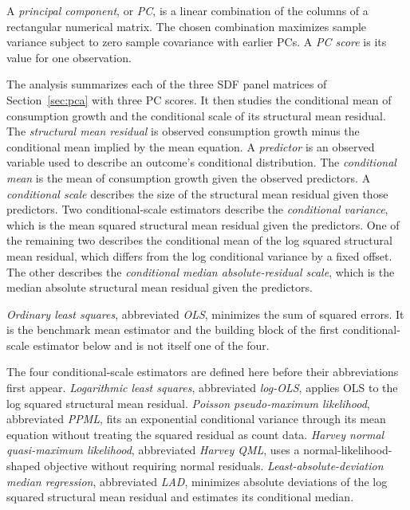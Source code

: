 \documentclass[11pt]{article}
\begin{document}
A \emph{principal component}, or \emph{PC}, is a linear combination of the columns of a
rectangular numerical matrix. The chosen combination maximizes sample variance subject to zero
sample covariance with earlier PCs. A \emph{PC score} is its value for one observation.

The analysis summarizes each of the three SDF panel matrices of Section~\ref{sec:pca} with three PC scores. It then studies the conditional
mean of consumption growth and the conditional scale of its structural mean residual. The
\emph{structural mean residual} is observed
consumption growth minus the conditional mean implied by the mean equation. A
\emph{predictor} is an observed variable used to describe an outcome's conditional distribution.
The \emph{conditional mean} is the mean of consumption growth given the observed predictors. A
\emph{conditional scale} describes the size of the structural mean residual given those predictors.
Two conditional-scale estimators describe the \emph{conditional variance}, which is the mean
squared structural mean residual given the predictors. One of the remaining two describes the
conditional mean of the log squared structural mean residual, which differs from the log conditional
variance by a fixed offset. The other describes the \emph{conditional
median absolute-residual scale}, which is the median absolute structural mean residual given the
predictors.

\emph{Ordinary least squares}, abbreviated \emph{OLS}, minimizes the sum of squared errors. It is the
benchmark mean estimator and the building block of the first conditional-scale estimator below and
is not itself one of the four.

The four conditional-scale estimators are defined here before their
abbreviations first appear.
\emph{Logarithmic least squares}, abbreviated \emph{log-OLS}, applies OLS to the log squared
structural mean residual. \emph{Poisson pseudo-maximum likelihood}, abbreviated
\emph{PPML}, fits an exponential conditional variance through its mean equation without treating
the squared residual as count data. \emph{Harvey normal quasi-maximum likelihood}, abbreviated
\emph{Harvey QML}, uses a normal-likelihood-shaped objective without requiring normal residuals.
\emph{Least-absolute-deviation median regression}, abbreviated \emph{LAD}, minimizes absolute
deviations of the log squared structural mean residual and estimates its conditional median.
\end{document}
